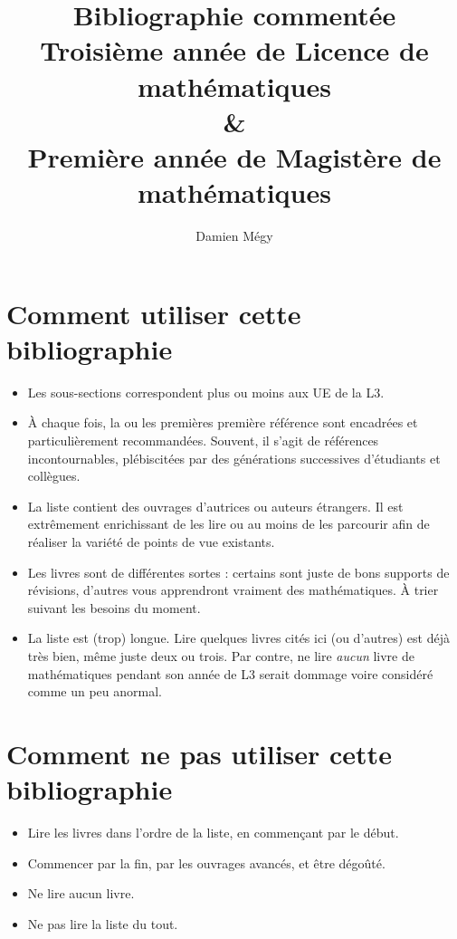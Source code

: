 \documentclass{article}
\begin{document}
\author{Damien Mégy}
\title{Bibliographie commentée\\Troisième année de Licence de mathématiques \\ \&\\ Première année de Magistère de mathématiques}

\maketitle
\tableofcontents


\section*{Comment utiliser cette bibliographie}
\begin{itemize}
\item Les sous-sections correspondent plus ou moins aux UE de la L3.
\item À chaque fois, la ou les premières première référence sont encadrées et  particulièrement recommandées. Souvent, il s'agit de références incontournables, plébiscitées par des générations successives d'étudiants et collègues. 
\item La liste contient des ouvrages d'autrices ou auteurs étrangers. Il est  extrêmement enrichissant de les lire ou au moins de les parcourir afin de réaliser la variété de points de vue existants.
\item Les livres sont de différentes sortes : certains sont juste de bons supports de révisions, d'autres vous apprendront vraiment des mathématiques. À trier suivant les besoins du moment.
\item La liste est (trop) longue. Lire quelques livres cités ici (ou d'autres) est déjà très bien, même juste deux ou trois. Par contre, ne lire \emph{aucun} livre de mathématiques pendant son année de L3 serait dommage voire considéré comme un peu anormal. 
\end{itemize}

\section*{Comment ne pas utiliser cette bibliographie}
\begin{itemize}
\item Lire les livres dans l'ordre de la liste, en commençant par le début.
\item Commencer par la fin, par les ouvrages avancés, et être dégoûté.
\item Ne lire aucun livre.
\item Ne pas lire la liste du tout.
\end{itemize}
\end{document}
